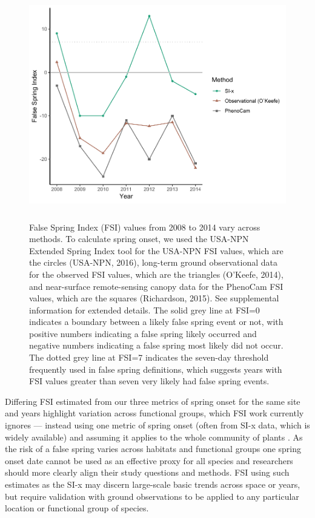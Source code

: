 \documentclass{article}\usepackage[]{graphicx}\usepackage[]{color}
\begin{document}
\begin{figure} [H] 
 \begin{center}
 \includegraphics[width=12cm, height=10cm]{..//figures/fsi_compare_color.pdf} 
 \caption{False Spring Index (FSI) values from 2008 to 2014 vary across methods. To calculate spring onset, we used the USA-NPN Extended Spring Index tool for the USA-NPN FSI values, which are the circles (USA-NPN, 2016), long-term ground observational data for the observed FSI values, which are the triangles (O'Keefe, 2014), and near-surface remote-sensing canopy data for the PhenoCam FSI values, which are the squares (Richardson, 2015). See supplemental information for extended details. The solid grey line at FSI=0 indicates a boundary between a likely false spring event or not, with positive numbers indicating a false spring likely occurred and negative numbers indicating a false spring most likely did not occur. The dotted grey line at FSI=7 indicates the seven-day threshold frequently used in false spring definitions, which suggests years with FSI values greater than seven very likely had false spring events.}\label{fig:fsifig} 
 \end{center}
 \end{figure}


Differing FSI estimated from our three metrics of spring onset for the same site and years highlight variation across functional groups, which FSI work currently ignores --- instead using one metric of spring onset (often from SI-x data, which is widely available) and assuming it applies to the whole community of plants \citep{Allstadt2015, Marino2011, Mehdipoor2017, Peterson2014}. As the risk of a false spring varies across habitats and functional groups \citep{Martin2010} one spring onset date cannot be used as an effective proxy for all species and researchers should more clearly align their study questions and methods. FSI using such estimates as the SI-x may discern large-scale basic trends across space or years, but require validation with ground observations to be applied to any particular location or functional group of species. 
\end{document}
